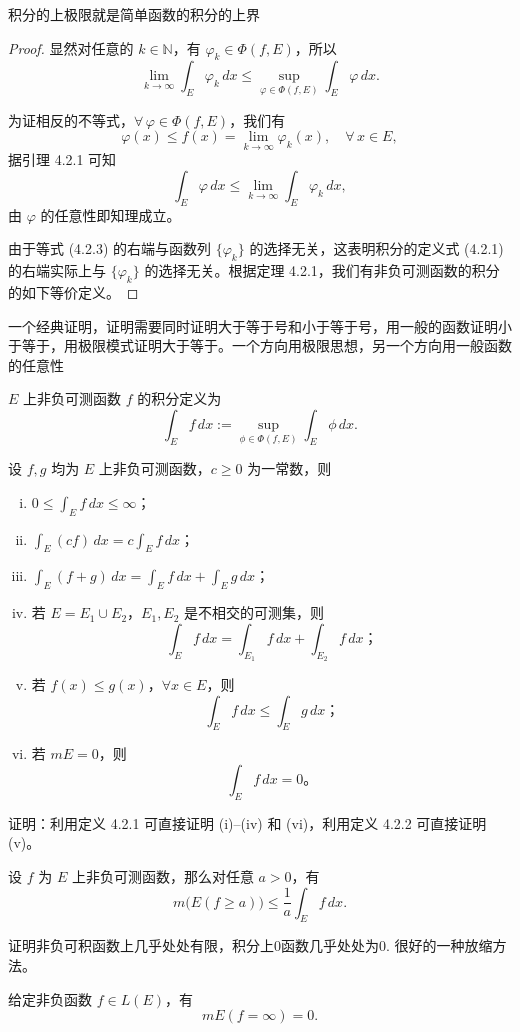 \documentclass[lang=cn,10pt]{elegantbook}
\begin{document}
积分的上极限就是简单函数的积分的上界
\begin{proof}
显然对任意的 $k \in \mathbb{N}$，有 $\varphi_k \in \Phi(f, E)$，所以
\[
\lim_{k \to \infty} \int_E \varphi_k \, dx
\le \sup_{\varphi \in \Phi(f, E)} \int_E \varphi \, dx.
\]

为证相反的不等式，$\forall\, \varphi \in \Phi(f, E)$，我们有
\[
\varphi(x) \le f(x) = \lim_{k \to \infty} \varphi_k(x), \quad \forall\, x \in E,
\]
据引理 4.2.1 可知
\[
\int_E \varphi \, dx \le \lim_{k \to \infty} \int_E \varphi_k \, dx,
\]
由 $\varphi$ 的任意性即知理成立。

由于等式 (4.2.3) 的右端与函数列 $\{\varphi_k\}$ 的选择无关，这表明积分的定义式 (4.2.1) 的右端实际上与 $\{\varphi_k\}$ 的选择无关。根据定理 4.2.1，我们有非负可测函数的积分的如下等价定义。
\end{proof}
\begin{dxtips}
    

一个经典证明，证明需要同时证明大于等于号和小于等于号，用一般的函数证明小于等于，用极限模式证明大于等于。一个方向用极限思想，另一个方向用一般函数的任意性
\end{dxtips}
\begin{definition}[4.2.2 非负可测函数积分的等价定义]
$E$ 上非负可测函数 $f$ 的积分定义为
\[
\int_E f \, dx := \sup_{\phi \in \Phi(f, E)} \int_E \phi \, dx .
\]
\end{definition}
\begin{theorem}[积分的基本性质]\label{thm:basic_properties_integral}
设 $f, g$ 均为 $E$ 上非负可测函数，$c \ge 0$ 为一常数，则  
\begin{enumerate}[(i)]
    \item $0 \le \int_E f \, dx \le \infty$；
    \item $\int_E (cf) \, dx = c \int_E f \, dx$；
    \item $\int_E (f+g) \, dx = \int_E f \, dx + \int_E g \, dx$；
    \item 若 $E = E_1 \cup E_2$，$E_1, E_2$ 是不相交的可测集，则  
    \[
        \int_E f \, dx = \int_{E_1} f \, dx + \int_{E_2} f \, dx；
    \]
    \item 若 $f(x) \le g(x)$，$\forall x \in E$，则  
    \[
        \int_E f \, dx \le \int_E g \, dx；
    \]
    \item 若 $mE = 0$，则  
    \[
        \int_E f \, dx = 0。
    \]
\end{enumerate}
\end{theorem}

\noindent 证明：利用定义 4.2.1 可直接证明 (i)--(iv) 和 (vi)，利用定义 4.2.2 可直接证明 (v)。
\begin{theorem}
设 $f$ 为 $E$ 上非负可测函数，那么对任意 $a>0$，有
\[
m\big(E(f \ge a)\big) \le \frac{1}{a} \int_E f \, dx.
\]
\end{theorem}
证明非负可积函数上几乎处处有限，积分上0函数几乎处处为0.
很好的一种放缩方法。
\begin{theorem}[可积函数是几乎处处有限的]
给定非负函数 $f \in L(E)$，有
\[
mE(f = \infty) = 0.
\]
\end{theorem}
\end{document}
